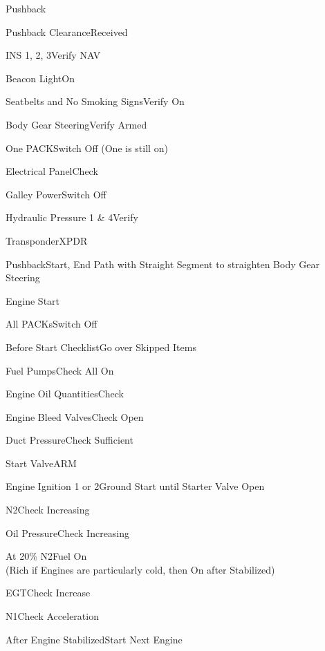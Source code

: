 \documentclass[sim-use, blue_items]{checklist}
\begin{document}
\begin{checklist}{Pushback}
	\item{Pushback Clearance}{Received}
	\item{INS 1, 2, 3}{Verify NAV}
	\item{Beacon Light}{On}
	\item{Seatbelts and No Smoking Signs}{Verify On}
	\item{Body Gear Steering}{Verify Armed}
	\item{One PACK}{Switch Off (One is still on)}
	\item{Electrical Panel}{Check}
	\item{Galley Power}{Switch Off}
	\item{Hydraulic Pressure 1 \& 4}{Verify}
	\item{Transponder}{XPDR}
	\item{Pushback}{Start, End Path with Straight Segment to straighten Body Gear Steering}
\end{checklist}

\begin{checklist}{Engine Start}
	\item{All PACKs}{Switch Off}
	\item{Before Start Checklist}{Go over Skipped Items}
	\item{Fuel Pumps}{Check All On}
	\item{Engine Oil Quantities}{Check}
	\item{Engine Bleed Valves}{Check Open}
	\item{Duct Pressure}{Check Sufficient}
	\item{Start Valve}{ARM}
	 {
		\item{Engine Ignition 1 or 2}{Ground Start until Starter Valve Open}
		\item{N2}{Check Increasing}
		\item{Oil Pressure}{Check Increasing}
		\item{At 20\% N2}{Fuel On\\(Rich if Engines are particularly cold, then On after Stabilized)}
		\item{EGT}{Check Increase}
		\item{N1}{Check Acceleration}
		\item{After Engine Stabilized}{Start Next Engine}
	}
\end{checklist}
\end{document}

